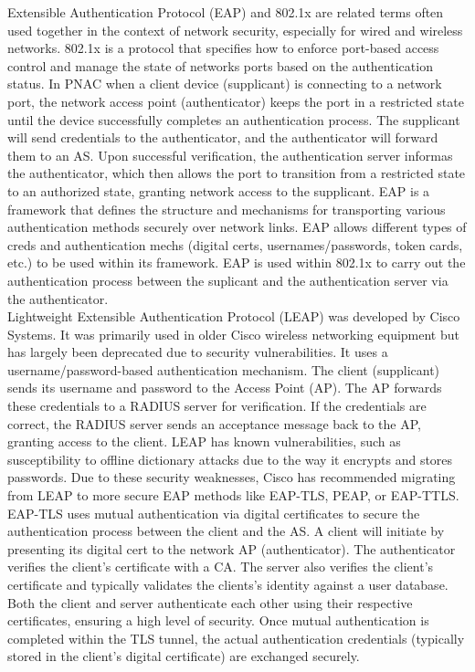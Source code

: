 \documentclass{article}
\begin{document}
	Extensible Authentication Protocol (EAP) and 802.1x are related terms often used together in the context of network security, especially for wired and wireless networks. 802.1x is a protocol that specifies how to enforce port-based access control and manage the state of networks ports based on the authentication status. In PNAC when a client device (supplicant) is connecting to a network port, the network access point (authenticator) keeps the port in a restricted state until the device successfully completes an authentication process. The supplicant will send credentials to the authenticator, and the authenticator will forward them to an AS. Upon successful verification, the authentication server informas the authenticator, which then allows the port to transition from a restricted state to an authorized state, granting network access to the supplicant. EAP is a framework that defines the structure and mechanisms for transporting various authentication methods securely over network links. EAP allows different types of creds and authentication mechs (digital certs, usernames/passwords, token cards, etc.) to be used within its framework. EAP is used within 802.1x to carry out the authentication process between the suplicant and the authentication server via the authenticator.\\
	
	Lightweight Extensible Authentication Protocol (LEAP) was developed by Cisco Systems. It was primarily used in older Cisco wireless networking equipment but has largely been deprecated due to security vulnerabilities. It uses a username/password-based authentication mechanism. The client (supplicant) sends its username and password to the Access Point (AP). The AP forwards these credentials to a RADIUS server for verification. If the credentials are correct, the RADIUS server sends an acceptance message back to the AP, granting access to the client. LEAP has known vulnerabilities, such as susceptibility to offline dictionary attacks due to the way it encrypts and stores passwords. Due to these security weaknesses, Cisco has recommended migrating from LEAP to more secure EAP methods like EAP-TLS, PEAP, or EAP-TTLS.\\

	EAP-TLS uses mutual authentication via digital certificates to secure the authentication process between the client and the AS. A client will initiate by presenting its digital cert to the network AP (authenticator). The authenticator verifies the client's certificate with a CA. The server also verifies the client's certificate and typically validates the clients's identity against a user database. Both the client and server authenticate each other using their respective certificates, ensuring a high level of security. Once mutual authentication is completed within the TLS tunnel, the actual authentication credentials (typically stored in the client's digital certificate) are exchanged securely.\\
\end{document}

